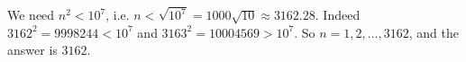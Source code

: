 We need $n^2<10^7$, i.e. $n<\sqrt{10^7}=1000\sqrt{10}\approx3162.28$. Indeed $3162^2=9998244<10^7$ and $3163^2=10004569>10^7$. So $n=1,2,\dots,3162$, and the answer is $\boxed{3162}$.

